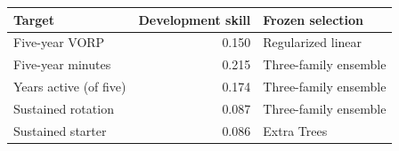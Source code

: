 \begin{tabular}{lrl}
\toprule
Target & Development skill & Frozen selection \\
\midrule
Five-year VORP & 0.150 & Regularized linear \\
Five-year minutes & 0.215 & Three-family ensemble \\
Years active (of five) & 0.174 & Three-family ensemble \\
Sustained rotation & 0.087 & Three-family ensemble \\
Sustained starter & 0.086 & Extra Trees \\
\bottomrule
\end{tabular}